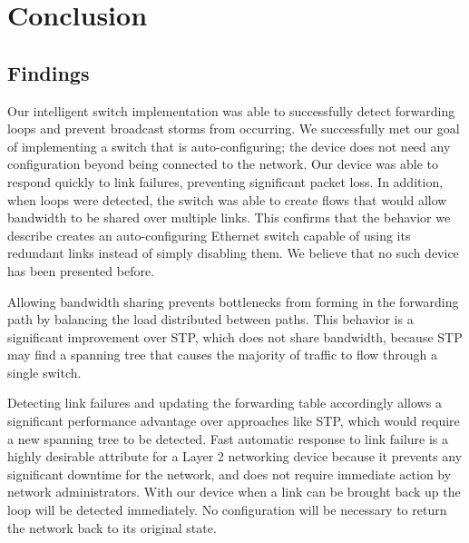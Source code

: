 \section{Conclusion}
\label{sec:conclusion}
  \subsection{Findings}
    Our intelligent switch implementation was able to successfully detect forwarding loops and prevent broadcast storms from occurring.
    We successfully met our goal of implementing a switch that is auto-configuring; the device does not need any configuration beyond being connected to the network.
    Our device was able to respond quickly to link failures, preventing significant packet loss.
    In addition, when loops were detected, the switch was able to create flows that would allow bandwidth to be shared over multiple links.
    This confirms that the behavior we describe creates an auto-configuring Ethernet switch capable of using its redundant links instead of simply disabling them.
    We believe that no such device has been presented before.
    
    Allowing bandwidth sharing prevents bottlenecks from forming in the forwarding path by balancing the load distributed between paths.
    This behavior is a significant improvement over STP, which does not share bandwidth, because STP may find a spanning tree that causes the majority of traffic to flow through a single switch.
    
    Detecting link failures and updating the forwarding table accordingly allows a significant performance advantage over approaches like STP, which would require a new spanning tree to be detected.
    Fast automatic response to link failure is a highly desirable attribute for a Layer 2 networking device because it prevents any significant downtime for the network, and does not require immediate action by network administrators.
    With our device when a link can be brought back up the loop will be detected immediately.
    No configuration will be necessary to return the network back to its original state.
